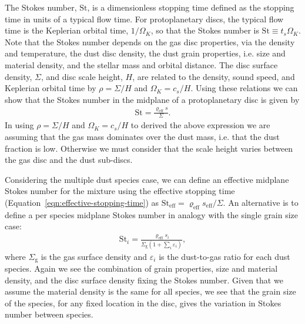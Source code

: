 \documentclass[fleqn,usenatbib]{mnras}
\newcommand{\g}{\mathrm{g}}
\begin{document}
The Stokes number, \(\mathrm{St}\), is a dimensionless stopping time defined as
the stopping time in units of a typical flow time. For protoplanetary discs, the
typical flow time is the Keplerian orbital time, \(1/\Omega_K\), so that the
Stokes number is \(\mathrm{St} \equiv t_s \Omega_K\). Note that the Stokes
number depends on the gas disc properties, via the density and temperature, the
dust disc density, the dust grain properties, i.e. size and material density,
and the stellar mass and orbital distance. The disc surface density, \(\Sigma\),
and disc scale height, \(H\), are related to the density, sound speed, and
Keplerian orbital time by \(\rho = \Sigma / H\) and \(\Omega_K = c_s / H\).
Using these relations we can show that the Stokes number in the midplane of a
protoplanetary disc is given by
%
\begin{align}
   \mathrm{St} = \frac{\varrho_{\mathrm{eff}} s}{\Sigma}.
\end{align}
%
In using \(\rho = \Sigma / H\) and \(\Omega_K = c_s / H\) to derived the above
expression we are assuming that the gas mass dominates over the dust mass, i.e.
that the dust fraction is low. Otherwise we must consider that the scale height
varies between the gas disc and the dust sub-discs.

Considering the multiple dust species case, we can define an effective midplane
Stokes number for the mixture using the effective stopping time
(Equation~\ref{eqn:effective-stopping-time}) as \(\mathrm{St}_{\mathrm{eff}} =
\varrho_{\mathrm{eff}} s_{\mathrm{eff}} / \Sigma \). An alternative is to define
a per species midplane Stokes number in analogy with the single grain size case:
%
\begin{align}
   \label{eqn:stokes}
   \mathrm{St}_i = \frac{\varrho_{\mathrm{eff}} s_i}
      {\Sigma_{\g} \left(1 + \sum_i \varepsilon_i \right)},
\end{align}
%
where \(\Sigma_{\g}\) is the gas surface density and \(\varepsilon_i\) is the
dust-to-gas ratio for each dust species. Again we see the combination of grain
properties, size and material density, and the disc surface density fixing the
Stokes number. Given that we assume the material density is the same for all
species, we see that the grain size of the species, for any fixed location in
the disc, gives the variation in Stokes number between species.
\end{document}
